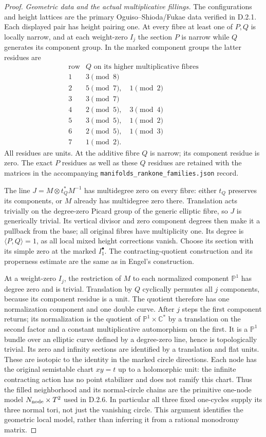 \begin{proof}
\emph{Geometric data and the actual multiplicative fillings.}
The configurations and height lattices are the primary
Oguiso--Shioda/Fukae data verified in D.2.1. Each displayed
pair has height pairing one. At every fibre at least one of
$P,Q$ is locally narrow, and at each weight-zero $I_j$ the
section $P$ is narrow while $Q$ generates its component group.
In the marked component groups the latter residues are
\[
 \begin{array}{c|l}
 \text{row}&Q\text{ on its higher multiplicative fibres}\\\hline
 1&3\pmod8\\
 2&5\pmod7,\quad1\pmod2\\
 3&3\pmod7\\
 4&2\pmod5,\quad3\pmod4\\
 5&3\pmod5,\quad1\pmod2\\
 6&2\pmod5,\quad1\pmod3\\
 7&1\pmod2.
 \end{array}
\]
All residues are units. At the additive fibre $Q$ is narrow;
its component residue is zero. The exact $P$ residues as well
as these $Q$ residues are retained with the matrices in the
accompanying \texttt{manifolds\_rankone\_families.json} record.

The line $J=M\otimes t_Q^*M^{-1}$ has multidegree zero on
every fibre: either $t_Q$ preserves its components, or $M$
already has multidegree zero there. Translation acts trivially on the degree-zero Picard group of
the generic elliptic fibre, so $J$ is generically trivial. Its
vertical divisor and zero component degrees then make it a
pullback from the base; all original fibres have multiplicity one.
Its degree is $\langle P,Q\rangle=1$, as all local mixed
height corrections vanish. Choose its section with its simple
zero at the marked $I_1^\bullet$. The contracting-quotient
construction and its properness estimate are the same as in
Engel's construction.

At a weight-zero $I_j$, the restriction of $M$ to each normalized
component $\mathbb P^1$ has degree zero and is trivial.
Translation by $Q$ cyclically permutes all $j$ components,
because its component residue is a unit. The quotient therefore
has one normalization component and one double curve.
After $j$ steps the first component returns; its normalization
is the quotient of $\mathbb P^1\times\mathbb C^*$ by a
translation on the second factor and a constant multiplicative
automorphism on the first. It is a $\mathbb P^1$ bundle over an
elliptic curve defined by a degree-zero line, hence is
topologically trivial. Its zero and infinity sections are
identified by a translation and flat units. These are isotopic
to the identity in the marked circle directions.
Each node has the original semistable chart $xy=t$ up to a
holomorphic unit: the infinite contracting action has no point
stabilizer and does not ramify this chart.
Thus the filled neighborhood and its normal-circle chains are
the primitive one-node model $N_{\rm node}\times T^2$ used
in D.2.6. In particular all three fixed one-cycles supply its
three normal tori, not just the vanishing circle.
This argument identifies the geometric local model, rather
than inferring it from a rational monodromy matrix.


\end{proof}
